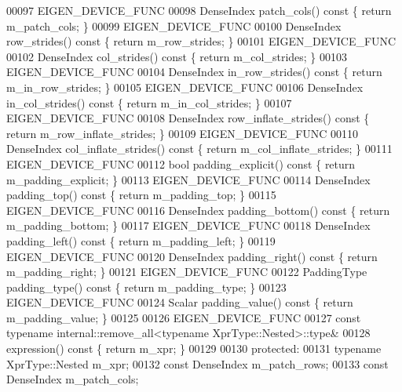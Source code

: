 \begin{DoxyCode}
00097     EIGEN\_DEVICE\_FUNC
00098     DenseIndex patch\_cols()\textcolor{keyword}{ const }\{ \textcolor{keywordflow}{return} m\_patch\_cols; \}
00099     EIGEN\_DEVICE\_FUNC
00100     DenseIndex row\_strides()\textcolor{keyword}{ const }\{ \textcolor{keywordflow}{return} m\_row\_strides; \}
00101     EIGEN\_DEVICE\_FUNC
00102     DenseIndex col\_strides()\textcolor{keyword}{ const }\{ \textcolor{keywordflow}{return} m\_col\_strides; \}
00103     EIGEN\_DEVICE\_FUNC
00104     DenseIndex in\_row\_strides()\textcolor{keyword}{ const }\{ \textcolor{keywordflow}{return} m\_in\_row\_strides; \}
00105     EIGEN\_DEVICE\_FUNC
00106     DenseIndex in\_col\_strides()\textcolor{keyword}{ const }\{ \textcolor{keywordflow}{return} m\_in\_col\_strides; \}
00107     EIGEN\_DEVICE\_FUNC
00108     DenseIndex row\_inflate\_strides()\textcolor{keyword}{ const }\{ \textcolor{keywordflow}{return} m\_row\_inflate\_strides; \}
00109     EIGEN\_DEVICE\_FUNC
00110     DenseIndex col\_inflate\_strides()\textcolor{keyword}{ const }\{ \textcolor{keywordflow}{return} m\_col\_inflate\_strides; \}
00111     EIGEN\_DEVICE\_FUNC
00112     \textcolor{keywordtype}{bool} padding\_explicit()\textcolor{keyword}{ const }\{ \textcolor{keywordflow}{return} m\_padding\_explicit; \}
00113     EIGEN\_DEVICE\_FUNC
00114     DenseIndex padding\_top()\textcolor{keyword}{ const }\{ \textcolor{keywordflow}{return} m\_padding\_top; \}
00115     EIGEN\_DEVICE\_FUNC
00116     DenseIndex padding\_bottom()\textcolor{keyword}{ const }\{ \textcolor{keywordflow}{return} m\_padding\_bottom; \}
00117     EIGEN\_DEVICE\_FUNC
00118     DenseIndex padding\_left()\textcolor{keyword}{ const }\{ \textcolor{keywordflow}{return} m\_padding\_left; \}
00119     EIGEN\_DEVICE\_FUNC
00120     DenseIndex padding\_right()\textcolor{keyword}{ const }\{ \textcolor{keywordflow}{return} m\_padding\_right; \}
00121     EIGEN\_DEVICE\_FUNC
00122     PaddingType padding\_type()\textcolor{keyword}{ const }\{ \textcolor{keywordflow}{return} m\_padding\_type; \}
00123     EIGEN\_DEVICE\_FUNC
00124     Scalar padding\_value()\textcolor{keyword}{ const }\{ \textcolor{keywordflow}{return} m\_padding\_value; \}
00125 
00126     EIGEN\_DEVICE\_FUNC
00127     \textcolor{keyword}{const} \textcolor{keyword}{typename} internal::remove\_all<typename XprType::Nested>::type&
00128     expression()\textcolor{keyword}{ const }\{ \textcolor{keywordflow}{return} m\_xpr; \}
00129 
00130   \textcolor{keyword}{protected}:
00131     \textcolor{keyword}{typename} XprType::Nested m\_xpr;
00132     \textcolor{keyword}{const} DenseIndex m\_patch\_rows;
00133     \textcolor{keyword}{const} DenseIndex m\_patch\_cols;

\end{DoxyCode}
